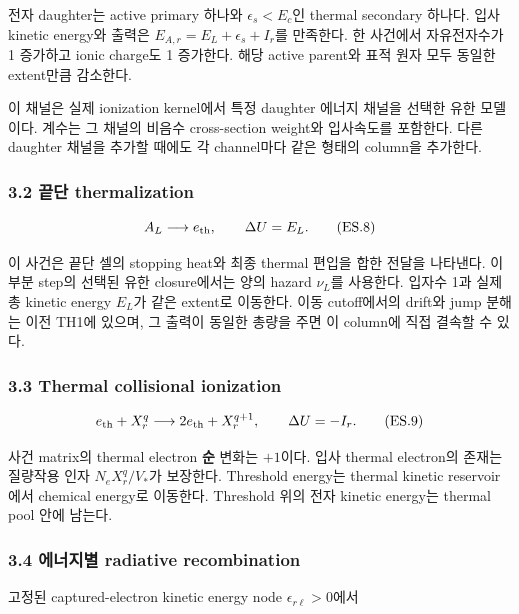 \documentclass[11pt,a4paper]{article}
\begin{document}
전자 daughter는 active primary 하나와 \(\epsilon_s<E_c\)인 thermal secondary 하나다. 입사 kinetic energy와 출력은 \(E_{A,r}=E_L+\epsilon_s+I_r\)를 만족한다. 한 사건에서 자유전자수가 1 증가하고 ionic charge도 1 증가한다. 해당 active parent와 표적 원자 모두 동일한 extent만큼 감소한다.

이 채널은 실제 ionization kernel에서 특정 daughter 에너지 채널을 선택한 유한 모델이다. 계수는 그 채널의 비음수 cross-section weight와 입사속도를 포함한다. 다른 daughter 채널을 추가할 때에도 각 channel마다 같은 형태의 column을 추가한다.

\hypertarget{uxb05duxb2e8-thermalization}{%
\subsubsection{3.2 끝단 thermalization}\label{uxb05duxb2e8-thermalization}}

\[
A_L\longrightarrow e_{\rm th},
\qquad \Delta U=E_L.
\tag{ES.8}
\]

이 사건은 끝단 셀의 stopping heat와 최종 thermal 편입을 합한 전달을 나타낸다. 이 부분 step의 선택된 유한 closure에서는 양의 hazard \(\nu_L\)를 사용한다. 입자수 1과 실제 총 kinetic energy \(E_L\)가 같은 extent로 이동한다. 이동 cutoff에서의 drift와 jump 분해는 이전 TH1에 있으며, 그 출력이 동일한 총량을 주면 이 column에 직접 결속할 수 있다.

\hypertarget{thermal-collisional-ionization}{%
\subsubsection{3.3 Thermal collisional ionization}\label{thermal-collisional-ionization}}

\[
e_{\rm th}+X_r^q
\longrightarrow2e_{\rm th}+X_r^{q+1},
\qquad \Delta U=-I_r.
\tag{ES.9}
\]

사건 matrix의 thermal electron \textbf{순} 변화는 \(+1\)이다. 입사 thermal electron의 존재는 질량작용 인자 \(N_eX_r^q/V_*\)가 보장한다. Threshold energy는 thermal kinetic reservoir에서 chemical energy로 이동한다. Threshold 위의 전자 kinetic energy는 thermal pool 안에 남는다.

\hypertarget{uxc5d0uxb108uxc9c0uxbcc4-radiative-recombination}{%
\subsubsection{3.4 에너지별 radiative recombination}\label{uxc5d0uxb108uxc9c0uxbcc4-radiative-recombination}}

고정된 captured-electron kinetic energy node \(\epsilon_{r\ell}>0\)에서
\end{document}
